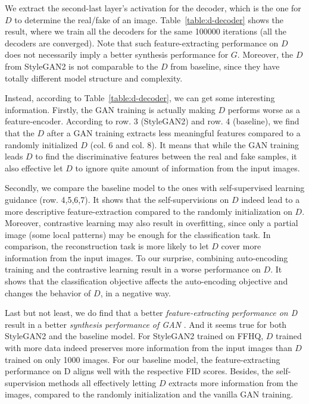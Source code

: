 \documentclass{article} \usepackage{iclr2021_conference,times}
\begin{document}
We extract the second-last layer's activation for the decoder, which is the one for $D$ to determine the real/fake of an image. Table~\ref{table:d-decoder} shows the result, where we train all the decoders for the same 100000 iterations (all the decoders are converged). Note that such feature-extracting performance on $D$ does not necessarily imply a better synthesis performance for $G$. Moreover, the $D$ from StyleGAN2 is not comparable to the $D$ from baseline, since they have totally different model structure and complexity. 

Instead, according to Table~\ref{table:d-decoder}, we can get some interesting information. Firstly, the GAN training is actually making $D$ performs worse as a feature-encoder. According to row. 3 (StyleGAN2) and row. 4
(baseline), we find that the $D$ after a GAN training extracts less meaningful features compared to a randomly initialized $D$ (col. 6 and col. 8). It means that while the GAN training leads $D$ to find the discriminative features between the real and fake samples, it also effective let $D$ to ignore quite amount of information from the input images.

Secondly, we compare the baseline model to the ones with self-supervised learning guidance (row. 4,5,6,7). It shows that the self-supervisions on $D$ indeed lead to a more descriptive feature-extraction compared to the randomly initialization on $D$. Moreover, contrastive learning may also result in overfitting, since only a partial image (some local patterns) may be enough for the classification task. In comparison, the reconstruction task is more likely to let $D$ cover more information from the input images. To our surprise, combining auto-encoding training and the contrastive learning result in a worse performance on $D$. It shows that the classification objective affects the auto-encoding objective and changes the behavior of $D$, in a negative way. 

Last but not least, we do find that a better \textit{ feature-extracting performance on D} result in a better \textit{ synthesis performance of GAN }. And it seems true for both StyleGAN2 and the baseline model. For StyleGAN2 trained on FFHQ, $D$ trained with more data indeed preserves more information from the input images than $D$ trained on only 1000 images. For our baseline model, the feature-extracting performance on D aligns well with the respective FID scores. Besides, the self-supervision methods all effectively letting $D$ extracts more information from the images, compared to the randomly initialization and the vanilla GAN training.
\end{document}

